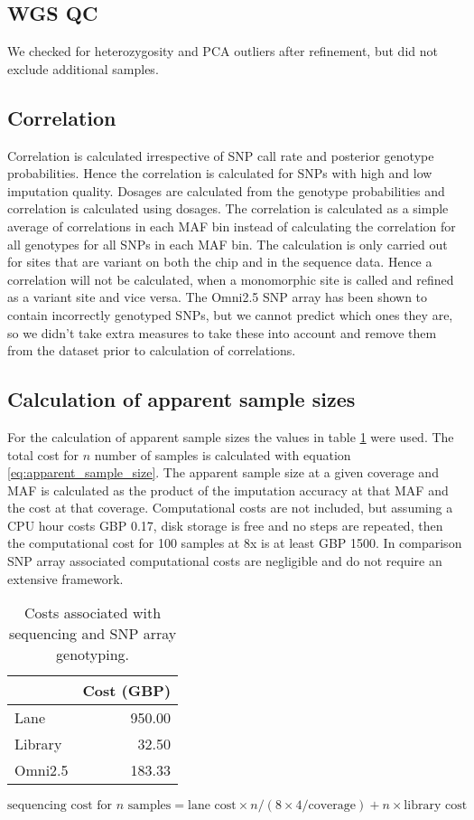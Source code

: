 \subsection{WGS QC}
We checked for heterozygosity and \gls{PCA} outliers after refinement, but did not exclude additional samples.

\subsection{Correlation}
Correlation is calculated irrespective of SNP call rate and posterior genotype probabilities. Hence the correlation is calculated for SNPs with high and low imputation quality. Dosages are calculated from the genotype probabilities and correlation is calculated using dosages. The correlation is calculated as a simple average of correlations in each MAF bin instead of calculating the correlation for all genotypes for all SNPs in each MAF bin. The calculation is only carried out for sites that are variant on both the chip and in the sequence data. Hence a correlation will not be calculated, when a monomorphic site is called and refined as a variant site and vice versa. The Omni2.5 SNP array has been shown to contain incorrectly genotyped SNPs\cite{Gurdasani2015}, but we cannot predict which ones they are, so we didn't take extra measures to take these into account and remove them from the dataset prior to calculation of correlations.

\subsection{Calculation of apparent sample sizes}
For the calculation of apparent sample sizes the values in table \ref{tab:chip_costs} were used. The total cost  for $n$ number of samples is calculated with equation \ref{eq:apparent_sample_size}. The apparent sample size at a given coverage and \gls{MAF} is calculated as the product of the imputation accuracy at that \gls{MAF} and the cost at that coverage. Computational costs are not included, but assuming a CPU hour costs GBP 0.17, disk storage is free and no steps are repeated, then the computational cost for 100 samples at 8x is at least GBP 1500. In comparison SNP array associated computational costs are negligible and do not require an extensive framework.

\begin{table}[htp]
\centering
\begin{tabular}{l|r}
 & Cost (GBP) \\ \hline
Lane & 950.00 \\
Library & 32.50 \\
Omni2.5 & 183.33 \\
\end{tabular}
\caption{Costs associated with sequencing and SNP array genotyping.}
\label{tab:chip_costs}
\end{table}

\begin{equation}
\text{sequencing cost for } n \text{ samples} = \text{lane cost} \times n/(8 \times 4 / \text{coverage}) + n \times \text{library cost}
\label{eq:apparent_sample_size}
\end{equation}